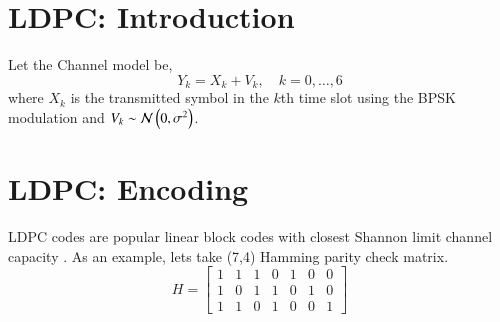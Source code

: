 \documentclass[journal,12pt,twocolumn]{IEEEtran}
\begin{document}
\section{LDPC: Introduction}
Let the Channel model be,
\begin{equation}
Y_k= X_k + V_k, \quad k = 0,\dots,6
\end{equation} 
where $X_k$ is the  transmitted symbol in the $k$th time slot using the BPSK modulation and $V_k \sim \mathcal{N}\left(0,\sigma^2\right) $. 

\section{LDPC: Encoding}
 LDPC codes are popular linear block codes with closest Shannon limit channel capacity \cite{ldpc}. As an example, lets take (7,4) Hamming parity check matrix.
 \begin{equation} \label{eq:H}
 H =  \begin{bmatrix} 
1 & 1 & 1 & 0 & 1 & 0 & 0 \\
1 & 0 & 1 & 1 & 0 & 1 & 0 \\
1 & 1 & 0 & 1 & 0 & 0 & 1 
\end{bmatrix}
 \end{equation}
\end{document}
